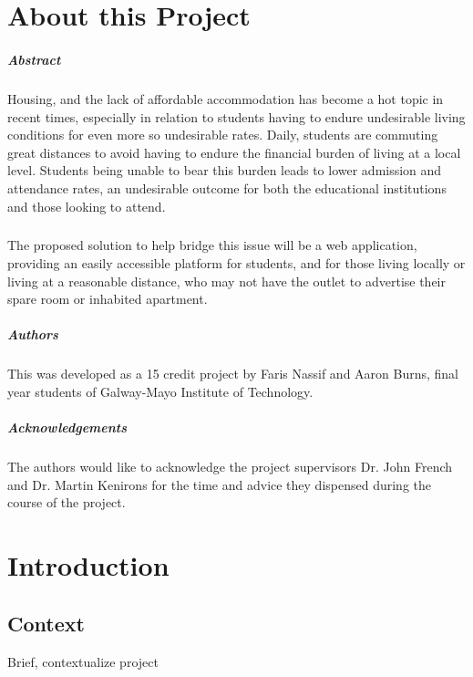 \chapter*{About this Project}
\paragraph{Abstract}
Housing, and the lack of affordable accommodation has become a hot topic in recent times, especially in relation to students having to endure undesirable living conditions for even more so undesirable rates. Daily, students are commuting great distances to avoid having to endure the financial burden of living at a local level. Students being unable to bear this burden leads to lower admission and attendance rates, an undesirable outcome for both the educational institutions and those looking to attend. 

\paragraph{}
The proposed solution to help bridge this issue will be a web application, providing an easily accessible platform for students, and for those living locally or living at a reasonable distance, who may not have the outlet to advertise their spare room or inhabited apartment. 

\paragraph{Authors}
This was developed as a 15 credit project by Faris Nassif and Aaron Burns, final year students of Galway-Mayo Institute of Technology.

\paragraph{Acknowledgements}
The authors would like to acknowledge the project supervisors Dr. John French and Dr. Martin Kenirons for the time and advice they dispensed during the course of the project.

\chapter{Introduction}


\section{Context}
Brief, contextualize project
